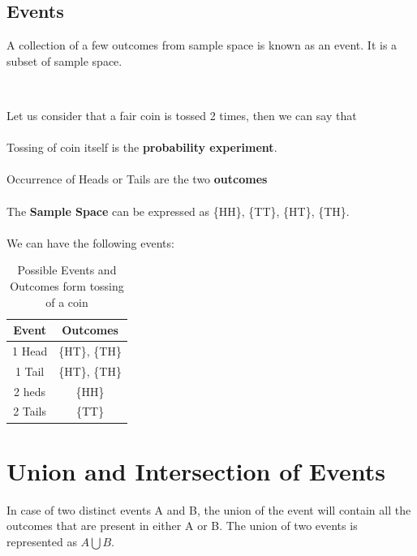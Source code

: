 \documentclass[twoside,12pt]{report}  %
\begin{document}
\subsection{Events}
\begin{tcolorbox}[colback=red!5!white, colframe=red!75!black, title = \textbf{Events}]
	A collection of a few outcomes from sample space is known as an event. It is a subset of sample space.
\end{tcolorbox}
\noindent
\\
\begin{tcolorbox}[colback=blue!5!white, colframe=blue!75!black, title = \textbf{Probability Experiment, Outcomes, Sample Space, Events}]
	Let us consider that a fair coin is tossed 2 times, then we can say that
	\\
	\\
	Tossing of coin itself is the \textbf{probability experiment}.
	\\
	\\
	Occurrence of Heads or Tails are the two \textbf{outcomes}
	\\
	\\
	The \textbf{Sample Space} can be expressed as \{HH\}, \{TT\}, \{HT\}, \{TH\}. 
	\\
	\\
	We can have the following events:
	
	\begin{table}[H]
		\centering
		\begin{tabular}{c|c}
			\textbf{Event}   & \textbf{Outcomes}       \\
			\hline
			1 Head  & \{HT\}, \{TH\} \\
			1 Tail  & \{HT\}, \{TH\} \\
			2 heds  & \{HH\}         \\
			2 Tails & \{TT\}     
		\end{tabular}
		\caption{Possible Events and Outcomes form tossing of a coin}
		\label{table_tossing _of_coin}
	\end{table}
\end{tcolorbox}
\section{Union and Intersection of Events}

\begin{tcolorbox}[colback=red!5!white, colframe=red!75!black, title = \textbf{Union of Events}]
	In case of two distinct events A and B, the union of the event will contain all the outcomes that are present in either A or B. The union of two events is represented as $A \bigcup B$.
\end{tcolorbox}
\end{document}
